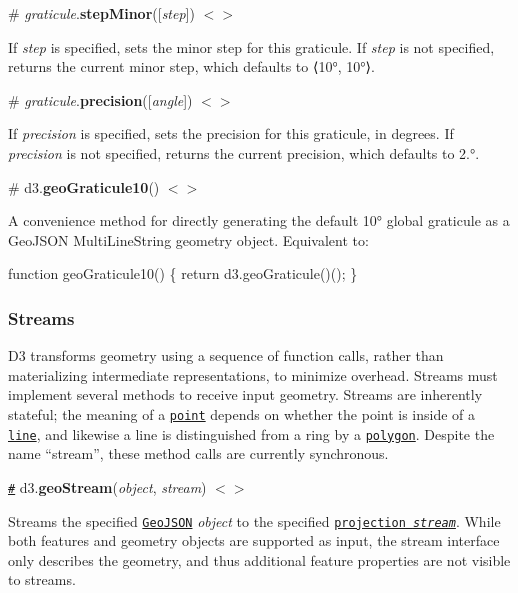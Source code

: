 \label{_graticule_stepMinor}%
\# {\itshape graticule}.{\bfseries step\+Minor}(\mbox{[}{\itshape step}\mbox{]}) \href{https://github.com/d3/d3-geo/blob/master/src/graticule.js#L82}{\tt $<$$>$}

If {\itshape step} is specified, sets the minor step for this graticule. If {\itshape step} is not specified, returns the current minor step, which defaults to ⟨10°, 10°⟩.

\label{_graticule_precision}%
\# {\itshape graticule}.{\bfseries precision}(\mbox{[}{\itshape angle}\mbox{]}) \href{https://github.com/d3/d3-geo/blob/master/src/graticule.js#L88}{\tt $<$$>$}

If {\itshape precision} is specified, sets the precision for this graticule, in degrees. If {\itshape precision} is not specified, returns the current precision, which defaults to 2.°.

\label{_geoGraticule10}%
\# d3.{\bfseries geo\+Graticule10}() \href{https://github.com/d3/d3-geo/blob/master/src/graticule.js#L103}{\tt $<$$>$}

A convenience method for directly generating the default 10° global graticule as a Geo\+J\+S\+ON Multi\+Line\+String geometry object. Equivalent to\+:


\begin{DoxyCode}
function geoGraticule10() \{
  return d3.geoGraticule()();
\}
\end{DoxyCode}


\subsubsection*{Streams}

D3 transforms geometry using a sequence of function calls, rather than materializing intermediate representations, to minimize overhead. Streams must implement several methods to receive input geometry. Streams are inherently stateful; the meaning of a \href{#point}{\tt point} depends on whether the point is inside of a \href{#lineStart}{\tt line}, and likewise a line is distinguished from a ring by a \href{#polygonStart}{\tt polygon}. Despite the name “stream”, these method calls are currently synchronous.

\href{#geoStream}{\tt \#} d3.{\bfseries geo\+Stream}({\itshape object}, {\itshape stream}) \href{https://github.com/d3/d3-geo/blob/master/src/stream.js}{\tt $<$$>$}

Streams the specified \href{http://geojson.org}{\tt Geo\+J\+S\+ON} {\itshape object} to the specified \href{#projection-streams}{\tt projection {\itshape stream}}. While both features and geometry objects are supported as input, the stream interface only describes the geometry, and thus additional feature properties are not visible to streams.

